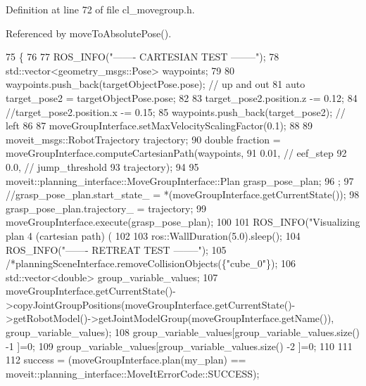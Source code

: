 Definition at line 72 of file cl\+\_\+movegroup.\+h.



Referenced by move\+To\+Absolute\+Pose().


\begin{DoxyCode}
75   \{
76 
77     ROS\_INFO(\textcolor{stringliteral}{"------- CARTESIAN TEST --------"});
78     std::vector<geometry\_msgs::Pose> waypoints;
79 
80     waypoints.push\_back(targetObjectPose.pose); \textcolor{comment}{// up and out}
81     \textcolor{keyword}{auto} target\_pose2 = targetObjectPose.pose;
82 
83     target\_pose2.position.z -= 0.12;
84     \textcolor{comment}{//target\_pose2.position.x -= 0.15;}
85     waypoints.push\_back(target\_pose2); \textcolor{comment}{// left}
86 
87     moveGroupInterface.setMaxVelocityScalingFactor(0.1);
88 
89     moveit\_msgs::RobotTrajectory trajectory;
90     \textcolor{keywordtype}{double} fraction = moveGroupInterface.computeCartesianPath(waypoints,
91                                                               0.01, \textcolor{comment}{// eef\_step}
92                                                               0.0,  \textcolor{comment}{// jump\_threshold}
93                                                               trajectory);
94 
95     moveit::planning\_interface::MoveGroupInterface::Plan grasp\_pose\_plan;
96     ;
97     \textcolor{comment}{//grasp\_pose\_plan.start\_state\_ = *(moveGroupInterface.getCurrentState());}
98     grasp\_pose\_plan.trajectory\_ = trajectory;
99     moveGroupInterface.execute(grasp\_pose\_plan);
100 
101     ROS\_INFO(\textcolor{stringliteral}{"Visualizing plan 4 (cartesian path) (%
102 
103     ros::WallDuration(5.0).sleep();
104     ROS\_INFO(\textcolor{stringliteral}{"------- RETREAT TEST --------"});
105     \textcolor{comment}{/*planningSceneInterface.removeCollisionObjects(\{"cube\_0"\});}
106 \textcolor{comment}{    std::vector<double> group\_variable\_values;}
107 \textcolor{comment}{   
       moveGroupInterface.getCurrentState()->copyJointGroupPositions(moveGroupInterface.getCurrentState()->getRobotModel()->getJointModelGroup(moveGroupInterface.getName()), group\_variable\_values);}
108 \textcolor{comment}{    group\_variable\_values[group\_variable\_values.size() -1 ]=0;}
109 \textcolor{comment}{    group\_variable\_values[group\_variable\_values.size() -2 ]=0;}
110 \textcolor{comment}{  }
111 \textcolor{comment}{    }
112 \textcolor{comment}{    success = (moveGroupInterface.plan(my\_plan) == moveit::planning\_interface::MoveItErrorCode::SUCCESS);}
}
\end{DoxyCode}
